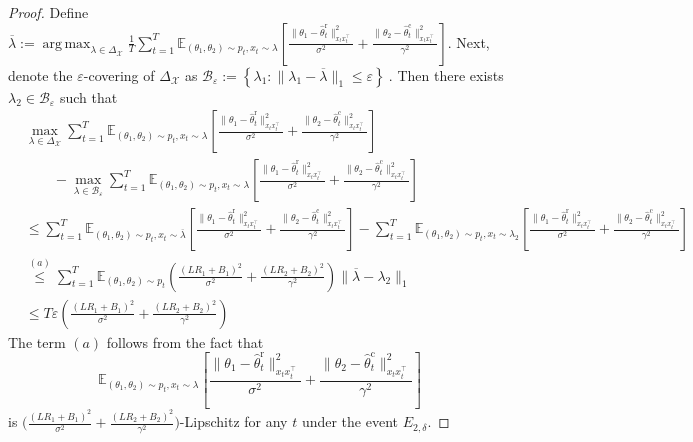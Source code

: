 \documentclass[10pt,a4paper]{amsart}
\DeclareMathOperator*{\argmax}{arg\,max}
\newcommand{\cbr}[1]{\left\{#1\right\}}
\newcommand{\hthetact}{\hat{\theta}_t^{\mathrm{c}}}
\newcommand{\hthetart}{\hat{\theta}_t^{\mathrm{r}}}
\begin{document}
\begin{proof}
Define $\overline{\lambda}:=\argmax_{\lambda \in \Delta_{\mathcal{X}}} \frac{1}{T} 
\sum_{t=1}^{T} \mathbb{E}_{(\theta_1, \theta_2) \sim p_t, x_t\sim \lambda} 
\left[ \frac{\|\theta_1 - \hthetart\|_{x_t x_t^\top}^2}{\sigma^2} 
+ \frac{\|\theta_2 - \hthetact\|_{x_t x_t^\top}^2}{\gamma^2} \right] $. Next, denote the $\varepsilon$-covering of $\Delta_{\mathcal{X}}$ as $\mathcal{B}_{\varepsilon}:=\cbr{\lambda_1 : \lVert \lambda_1-\overline{\lambda} \rVert_1\le \varepsilon}~.$
Then there exists $\lambda_2\in\mathcal{B}_\varepsilon$ such that %
\begin{align*}
    &\max_{\lambda \in \Delta_{\mathcal{X}}}  
\sum_{t=1}^{T} \mathbb{E}_{(\theta_1, \theta_2) \sim p_t, x_t\sim \lambda} 
\left[ \frac{\|\theta_1 - \hthetart\|_{x_t x_t^\top}^2}{\sigma^2} 
+ \frac{\|\theta_2 - \hthetact\|_{x_t x_t^\top}^2}{\gamma^2} \right] \\
&\qquad- \max_{\lambda \in \mathcal{B}_\varepsilon}  
\sum_{t=1}^{T} \mathbb{E}_{(\theta_1, \theta_2) \sim p_t, x_t\sim \lambda} 
\left[ \frac{\|\theta_1 - \hthetart\|_{x_t x_t^\top}^2}{\sigma^2} 
+ \frac{\|\theta_2 - \hthetact\|_{x_t x_t^\top}^2}{\gamma^2} \right]
\\
&\le\sum_{t=1}^{T} \mathbb{E}_{(\theta_1, \theta_2) \sim p_t, x_t\sim \overline{\lambda}} 
\left[ \frac{\|\theta_1 - \hthetart\|_{x_t x_t^\top}^2}{\sigma^2} 
+ \frac{\|\theta_2 - \hthetact\|_{x_t x_t^\top}^2}{\gamma^2}  \right]-\sum_{t=1}^{T} \mathbb{E}_{(\theta_1, \theta_2) \sim p_t, x_t\sim \lambda_2} 
\left[ \frac{\|\theta_1 - \hthetart\|_{x_t x_t^\top}^2}{\sigma^2} 
+ \frac{\|\theta_2 - \hthetact\|_{x_t x_t^\top}^2}{\gamma^2}\right]
\\&\stackrel{(a)}{\le} \sum_{t=1}^T \mathbb{E}_{(\theta_1, \theta_2) \sim p_t} \left(\frac{(LR_1+B_1)^2}{\sigma^2}+\frac{(LR_2+B_2)^2}{\gamma^2}\right)\lVert\overline{\lambda}-\lambda_2 \rVert_1 
\\&\le T\varepsilon \left(\frac{(LR_1+B_1)^2}{\sigma^2}+\frac{(LR_2+B_2)^2}{\gamma^2}\right)
\end{align*}
The term $(a)$ follows from the fact that 
\[
\mathbb{E}_{(\theta_1, \theta_2) \sim p_t, x_t \sim \lambda} \left[ \frac{\|\theta_1 - \hat{\theta}_t^{\mathrm{r}}\|_{x_t x_t^\top}^2}{\sigma^2} + \frac{\|\theta_2 - \hat{\theta}_t^{\mathrm{c}}\|_{x_t x_t^\top}^2}{\gamma^2} \right]
\]
is \( \Big(\frac{(LR_1 + B_1)^2}{\sigma^2} + \frac{(LR_2 + B_2)^2}{\gamma^2} \Big)\)-Lipschitz  for any \( t \) under the event \( E_{2, \delta} \).


\end{proof}
\end{document}
